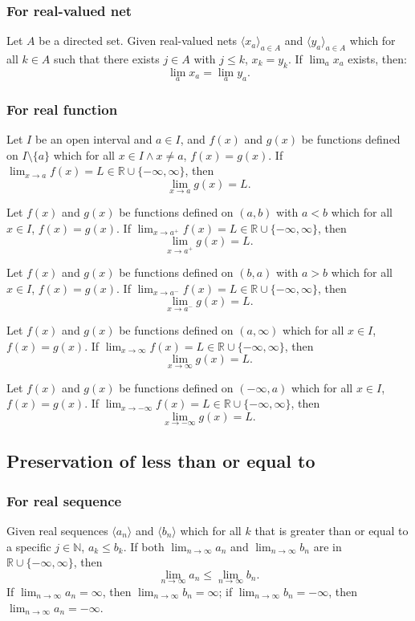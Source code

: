 \subsubsection{For real-valued net}
Let $A$ be a directed set. Given real-valued nets $\langle x_a\rangle_{a\in A}$ and $\langle y_a\rangle_{a\in A}$ which for all $k\in A$ such that there exists $j\in A$ with $j\leq k$, $x_k=y_k$. If $\lim_{a}x_a$ exists, then:
\[\lim_{a}x_a=\lim_{a}y_a.\]
\subsubsection{For real function}
Let $I$ be an open interval and $a\in I$, and $f(x)$ and $g(x)$ be functions defined on $I\setminus\{a\}$ which for all $x\in I\land x\neq a$, $f(x)=g(x)$. If $\lim_{x\to a}f(x)=L\in\mathbb{R}\cup\{-\infty,\infty\}$, then
\[\lim_{x\to a}g(x)=L.\]

Let $f(x)$ and $g(x)$ be functions defined on $(a,b)$ with $a<b$ which for all $x\in I$, $f(x)=g(x)$. If $\lim_{x\to a^+}f(x)=L\in\mathbb{R}\cup\{-\infty,\infty\}$, then
\[\lim_{x\to a^+}g(x)=L.\]

Let $f(x)$ and $g(x)$ be functions defined on $(b,a)$ with $a>b$ which for all $x\in I$, $f(x)=g(x)$. If $\lim_{x\to a^-}f(x)=L\in\mathbb{R}\cup\{-\infty,\infty\}$, then
\[\lim_{x\to a^-}g(x)=L.\]

Let $f(x)$ and $g(x)$ be functions defined on $(a,\infty)$ which for all $x\in I$, $f(x)=g(x)$. If $\lim_{x\to\infty}f(x)=L\in\mathbb{R}\cup\{-\infty,\infty\}$, then
\[\lim_{x\to\infty}g(x)=L.\]

Let $f(x)$ and $g(x)$ be functions defined on $(-\infty,a)$ which for all $x\in I$, $f(x)=g(x)$. If $\lim_{x\to-\infty}f(x)=L\in\mathbb{R}\cup\{-\infty,\infty\}$, then
\[\lim_{x\to-\infty}g(x)=L.\]
\subsection{Preservation of less than or equal to}
\subsubsection{For real sequence}
Given real sequences $\langle a_n\rangle$ and $\langle b_n\rangle$ which for all $k$ that is greater than or equal to a specific $j\in \mathbb{N}$, $a_k\leq b_k$. If both $\lim_{n\to\infty}a_n$ and $\lim_{n\to\infty}b_n$ are in $\mathbb{R}\cup\{-\infty,\infty\}$, then
\[\lim_{n\to\infty}a_n\leq\lim_{n\to\infty}b_n.\]
If $\lim_{n\to\infty}a_n=\infty$, then $\lim_{n\to\infty}b_n=\infty$; if $\lim_{n\to\infty}b_n=-\infty$, then $\lim_{n\to\infty}a_n=-\infty$.
